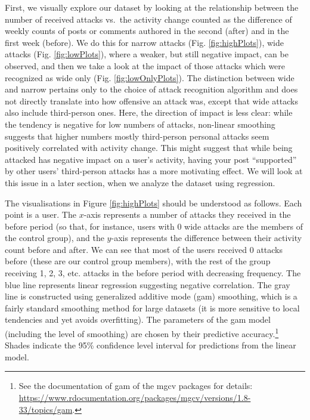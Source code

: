 \documentclass[10pt,]{scrartcl}
\begin{document}
First, we visually explore our dataset by looking at the relationship
between the number of received attacks vs.~the activity change counted
as the difference of weekly counts of posts or comments authored in the
second (\textsf{after}) and in the first week (\textsf{before}). We do
this for \textsf{narrow} attacks (Fig. \ref{fig:highPlots}),
\textsf{wide} attacks (Fig. \ref{fig:lowPlots}), where a weaker, but
still negative impact, can be observed, and then we take a look at the
impact of those attacks which were recognized as \textsf{wide only}
(Fig. \ref{fig:lowOnlyPlots}). The distinction between wide and narrow
pertains only to the choice of attack recognition algorithm and does not
directly translate into how offensive an attack was, except that
\textsf{wide} attacks also include third-person ones. Here, the
direction of impact is less clear: while the tendency is negative for
low numbers of attacks, non-linear smoothing suggests that higher
numbers mostly third-person personal attacks seem positively correlated
with activity change. This might suggest that while being attacked has
negative impact on a user's activity, having your post ``supported'' by
other users' third-person attacks has a more motivating effect. We will
look at this issue in a later section, when we analyze the dataset using
regression.

The visualisations in Figure \ref{fig:highPlots} should be understood as
follows. Each point is a user. The \(x\)-axis represents a number of
attacks they received in the \textsf{before} period (so that, for
instance, users with 0 wide attacks are the members of the control
group), and the \(y\)-axis represents the difference between their
activity count \textsf{before} and \textsf{after}. We can see that most
of the users received 0 attacks before (these are our control group
members), with the rest of the group receiving 1, 2, 3, etc. attacks in
the \textsf{before} period with decreasing frequency. The blue line
represents linear regression suggesting negative correlation. The gray
line is constructed using generalized additive mode (gam) smoothing,
which is a fairly standard smoothing method for large datasets (it is
more sensitive to local tendencies and yet avoids overfitting). The
parameters of the gam model (including the level of smoothing) are
chosen by their predictive
accuracy.\footnote{See  the documentation of \textsf{gam} of the \textsf{mgcv} packages for details: \url{https://www.rdocumentation.org/packages/mgcv/versions/1.8-33/topics/gam}.}
Shades indicate the 95\% confidence level interval for predictions from
the linear model.
\end{document}
